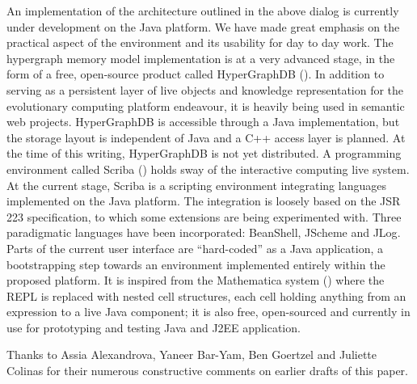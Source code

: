 \documentclass[10pt]{sigplanconf}
\begin{document}
An implementation of the architecture outlined in the above dialog is currently under development on the Java platform. We have made great emphasis on the practical aspect of the environment and its usability for day to day work. The hypergraph memory model implementation is at a very advanced stage, in the form of a free, open-source product called HyperGraphDB (\cite{kobrix1}). In addition to serving as a persistent layer of live objects and knowledge representation for the evolutionary computing platform endeavour, it is heavily being used in semantic web projects. HyperGraphDB is accessible through a Java implementation, but the storage layout is independent of Java and a C++ access layer is planned. At the time of this writing, HyperGraphDB is not yet distributed. A programming environment called Scriba (\cite{kobrix2}) holds sway of the interactive computing live system. At the current stage, Scriba is a scripting environment integrating languages implemented on the Java platform. The integration is loosely based on the JSR 223 specification, to which some extensions are being experimented with. Three paradigmatic languages have been incorporated: BeanShell\cite{beanshell}, JScheme\cite{jscheme} and JLog\cite{jlog}. Parts of the current user interface are ``hard-coded'' as a Java application, a bootstrapping step towards an environment implemented entirely within the proposed platform. It is inspired from the Mathematica system (\cite{mathematica}) where the REPL is replaced with nested cell structures, each cell holding anything from an expression to a live Java component; it is also free, open-sourced and currently in use for prototyping and testing Java and J2EE application.

\acks

Thanks to Assia Alexandrova, Yaneer Bar-Yam, Ben Goertzel and Juliette Colinas for their numerous constructive comments on earlier drafts of this paper.
\end{document}
